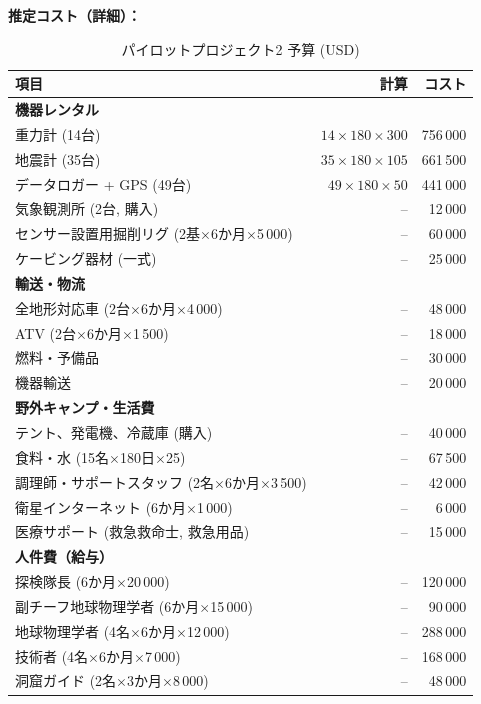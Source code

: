 \documentclass[12pt,a4paper]{article}
\theoremstyle{remark}
\begin{document}
	\textbf{推定コスト（詳細）：}
	\begin{table}[htbp]
		\centering
		\caption{パイロットプロジェクト2 予算 (USD)}
		\label{tab:budget-karst}
		\small
		\begin{tabular}{lrr}
			\toprule
			\textbf{項目} & \textbf{計算} & \textbf{コスト} \\
			\midrule
			\multicolumn{3}{l}{\textbf{機器レンタル}} \\
			重力計 (14台) & $14\times180\times300$ & 756\,000 \\
			地震計 (35台) & $35\times180\times105$ & 661\,500 \\
			データロガー + GPS (49台) & $49\times180\times50$ & 441\,000 \\
			気象観測所 (2台, 購入) & – & 12\,000 \\
			センサー設置用掘削リグ (2基$\times$6か月$\times$5\,000) & – & 60\,000 \\
			ケービング器材 (一式) & – & 25\,000 \\
			\multicolumn{3}{l}{\textbf{輸送・物流}} \\
			全地形対応車 (2台$\times$6か月$\times$4\,000) & – & 48\,000 \\
			ATV (2台$\times$6か月$\times$1\,500) & – & 18\,000 \\
			燃料・予備品 & – & 30\,000 \\
			機器輸送 & – & 20\,000 \\
			\multicolumn{3}{l}{\textbf{野外キャンプ・生活費}} \\
			テント、発電機、冷蔵庫 (購入) & – & 40\,000 \\
			食料・水 (15名$\times$180日$\times$25) & – & 67\,500 \\
			調理師・サポートスタッフ (2名$\times$6か月$\times$3\,500) & – & 42\,000 \\
			衛星インターネット (6か月$\times$1\,000) & – & 6\,000 \\
			医療サポート (救急救命士, 救急用品) & – & 15\,000 \\
			\multicolumn{3}{l}{\textbf{人件費（給与）}} \\
			探検隊長 (6か月$\times$20\,000) & – & 120\,000 \\
			副チーフ地球物理学者 (6か月$\times$15\,000) & – & 90\,000 \\
			地球物理学者 (4名$\times$6か月$\times$12\,000) & – & 288\,000 \\
			技術者 (4名$\times$6か月$\times$7\,000) & – & 168\,000 \\
			洞窟ガイド (2名$\times$3か月$\times$8\,000) & – & 48\,000 \\

\end{tabular}
\end{table}
\end{document}
